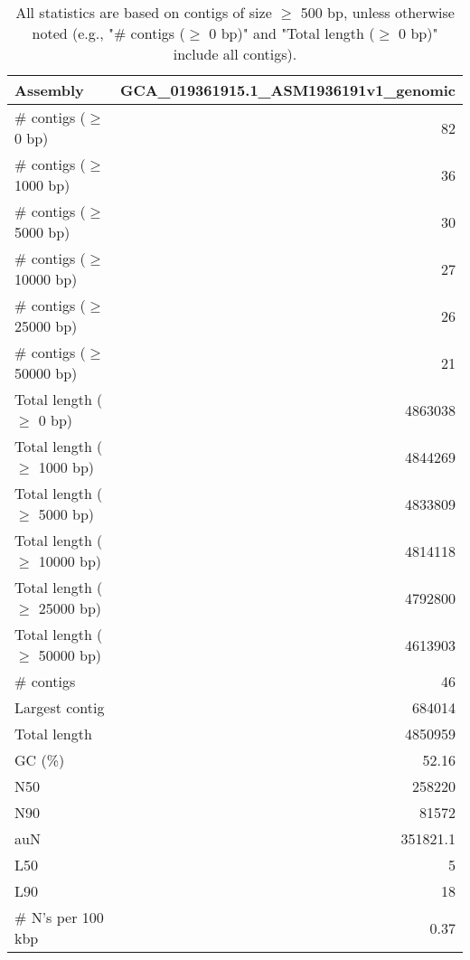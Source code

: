 \documentclass[12pt,a4paper]{article}
\begin{document}
\begin{table}[ht]
\begin{center}
\caption{All statistics are based on contigs of size $\geq$ 500 bp, unless otherwise noted (e.g., "\# contigs ($\geq$ 0 bp)" and "Total length ($\geq$ 0 bp)" include all contigs).}
\begin{tabular}{|l*{1}{|r}|}
\hline
Assembly & GCA\_019361915.1\_ASM1936191v1\_genomic \\ \hline
\# contigs ($\geq$ 0 bp) & 82 \\ \hline
\# contigs ($\geq$ 1000 bp) & 36 \\ \hline
\# contigs ($\geq$ 5000 bp) & 30 \\ \hline
\# contigs ($\geq$ 10000 bp) & 27 \\ \hline
\# contigs ($\geq$ 25000 bp) & 26 \\ \hline
\# contigs ($\geq$ 50000 bp) & 21 \\ \hline
Total length ($\geq$ 0 bp) & 4863038 \\ \hline
Total length ($\geq$ 1000 bp) & 4844269 \\ \hline
Total length ($\geq$ 5000 bp) & 4833809 \\ \hline
Total length ($\geq$ 10000 bp) & 4814118 \\ \hline
Total length ($\geq$ 25000 bp) & 4792800 \\ \hline
Total length ($\geq$ 50000 bp) & 4613903 \\ \hline
\# contigs & 46 \\ \hline
Largest contig & 684014 \\ \hline
Total length & 4850959 \\ \hline
GC (\%) & 52.16 \\ \hline
N50 & 258220 \\ \hline
N90 & 81572 \\ \hline
auN & 351821.1 \\ \hline
L50 & 5 \\ \hline
L90 & 18 \\ \hline
\# N's per 100 kbp & 0.37 \\ \hline
\end{tabular}
\end{center}
\end{table}
\end{document}
